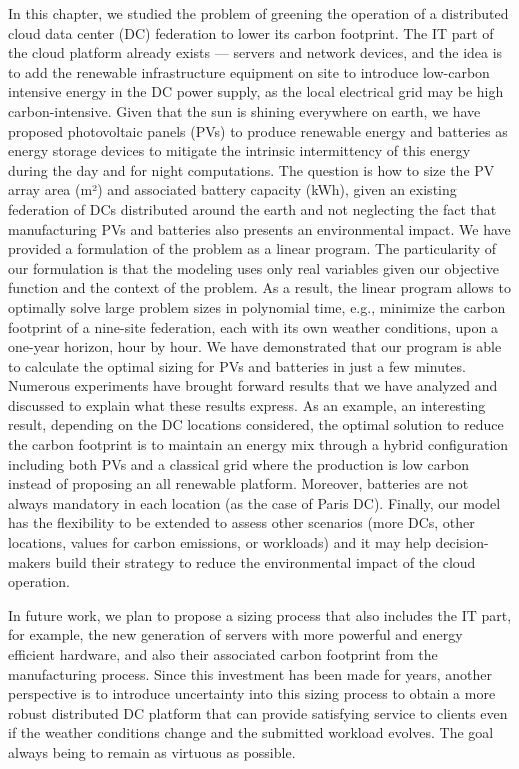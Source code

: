 In this chapter, we studied the problem of greening the operation of a distributed cloud data center (DC) federation to lower its carbon footprint. The IT part of the cloud platform already exists --- servers and network devices, and the idea is to add the renewable infrastructure equipment on site to introduce low-carbon intensive energy in the DC power supply, as the local electrical grid may be high carbon-intensive. Given that the sun is shining everywhere on earth, we have proposed photovoltaic panels (PVs) to produce renewable energy and batteries as energy storage devices to mitigate the intrinsic intermittency of this energy during the day and for night computations. The question is how to size the PV array area (m²) and associated battery capacity (kWh), given an existing federation of DCs distributed around the earth and not neglecting the fact that manufacturing PVs and batteries also presents an environmental impact. We have provided a formulation of the problem as a linear program. The particularity of our formulation is that the modeling uses only real variables given our objective function and the context of the problem. As a result, the linear program allows to optimally solve large problem sizes in polynomial time, e.g., minimize the carbon footprint of a nine-site federation, each with its own weather conditions, upon a one-year horizon, hour by hour. We have demonstrated that our program is able to calculate the optimal sizing for PVs and batteries in just a few minutes. Numerous experiments have brought forward results that we have analyzed and discussed to explain what these results express. As an example, an interesting result, depending on the DC locations considered, the optimal solution to reduce the carbon footprint is to maintain an energy mix through a hybrid configuration including both PVs and a classical grid where the production is low carbon instead of proposing an all renewable platform. Moreover, batteries are not always mandatory in each location (as the case of Paris DC). Finally, our model has the flexibility to be extended to assess other scenarios (more DCs, other locations, values for  carbon emissions, or workloads) and it may help decision-makers build their strategy to reduce the environmental impact of the cloud operation. 

In future work, we plan to propose a sizing process that also includes the IT part, for example, the new generation of servers with more powerful and energy efficient hardware, and also their associated carbon footprint from the manufacturing process. Since this investment has been made for years, another perspective is to introduce uncertainty into this sizing process to obtain a more robust distributed DC platform that can provide satisfying service to clients even if the weather conditions change and the submitted workload evolves. The goal always being to remain as virtuous as possible. 

